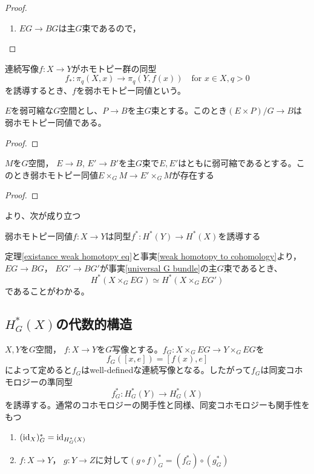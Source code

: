 \begin{proof}
  \begin{enumerate}
    \item $EG\rightarrow BG$は主$G$束であるので，
  \end{enumerate}
\end{proof}

連続写像$f\colon X\rightarrow Y$がホモトピー群の同型
\[
f_*\colon\pi_q(X, x)\rightarrow \pi_q(Y, f(x))\quad\text{for } x\in X, q>0 
\]
を誘導するとき、$f$を弱ホモトピー同値という。

\begin{lemm}
  $E$を弱可縮な$G$空間とし、$P\rightarrow B$を主$G$束とする。このとき$(E\times P)/G\rightarrow B$は弱ホモトピー同値である。
\end{lemm}

\begin{proof}
  
\end{proof}

\begin{theo}\label{existance weak homotopy eq}
  $M$を$G$空間， $E\rightarrow B$, $E'\rightarrow B'$を主$G$束で$E,E'$はともに弱可縮であるとする。このとき弱ホモトピー同値$E\times_GM\rightarrow E'\times_GM$が存在する
\end{theo}

\begin{proof}
  
\end{proof}

\cite{hatcher}より、次が成り立つ 
\begin{fact}\label{weak homotopy to cohomology}
  弱ホモトピー同値$f\colon X\rightarrow Y$は同型$f^*\colon H^*(Y)\rightarrow H^*(X)$を誘導する
\end{fact}

定理\ref{existance weak homotopy eq}と事実\ref{weak homotopy to cohomology}より， $EG\rightarrow BG$， $EG'\rightarrow BG'$が事実\ref{universal G bundle}の主$G$束であるとき、
\[
H^*(X\times_GEG)\simeq H^*(X\times_GEG')
\]
であることがわかる。

\subsection{$H^*_G(X)$の代数的構造}

$X, Y$を$G$空間， $f\colon X\rightarrow Y$を$G$写像とする。$f_G\colon X\times_GEG\rightarrow Y\times_GEG$を
\[
f_G([x, e])=[f(x), e]
\]
によって定めると$f_G$はwell-definedな連続写像となる。したがって$f_G$は同変コホモロジーの準同型
\[
f_G^*\colon H^*_G(Y)\rightarrow H^*_G(X)
\]
を誘導する。通常のコホモロジーの関手性と同様、同変コホモロジーも関手性をもつ
\begin{prop}\:
  \begin{enumerate}
    \item $(\text{id}_{X})_G^*=\text{id}_{H^*_G(X)}$
    \item $f\colon X\rightarrow Y$， $g\colon Y\rightarrow Z$に対して$(g\circ f)_G^*=(f_G^*)\circ(g_G^*)$
  \end{enumerate}
\end{prop}


